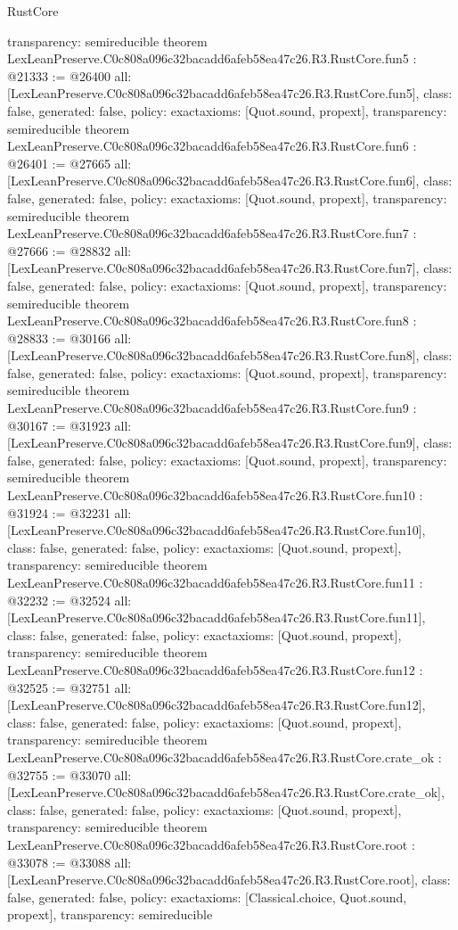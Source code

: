 \begin{lexlean}{RustCore}
\begin{coremodule}
{  transparency: semireducible
}
theorem LexLeanPreserve.C0c808a096c32bacadd6afeb58ea47c26.R3.RustCore.fun5 : @21333 := @26400 {
  all: [LexLeanPreserve.C0c808a096c32bacadd6afeb58ea47c26.R3.RustCore.fun5],
  class: false,
  generated: false,
  policy: exact{axioms: [Quot.sound, propext]},
  transparency: semireducible
}
theorem LexLeanPreserve.C0c808a096c32bacadd6afeb58ea47c26.R3.RustCore.fun6 : @26401 := @27665 {
  all: [LexLeanPreserve.C0c808a096c32bacadd6afeb58ea47c26.R3.RustCore.fun6],
  class: false,
  generated: false,
  policy: exact{axioms: [Quot.sound, propext]},
  transparency: semireducible
}
theorem LexLeanPreserve.C0c808a096c32bacadd6afeb58ea47c26.R3.RustCore.fun7 : @27666 := @28832 {
  all: [LexLeanPreserve.C0c808a096c32bacadd6afeb58ea47c26.R3.RustCore.fun7],
  class: false,
  generated: false,
  policy: exact{axioms: [Quot.sound, propext]},
  transparency: semireducible
}
theorem LexLeanPreserve.C0c808a096c32bacadd6afeb58ea47c26.R3.RustCore.fun8 : @28833 := @30166 {
  all: [LexLeanPreserve.C0c808a096c32bacadd6afeb58ea47c26.R3.RustCore.fun8],
  class: false,
  generated: false,
  policy: exact{axioms: [Quot.sound, propext]},
  transparency: semireducible
}
theorem LexLeanPreserve.C0c808a096c32bacadd6afeb58ea47c26.R3.RustCore.fun9 : @30167 := @31923 {
  all: [LexLeanPreserve.C0c808a096c32bacadd6afeb58ea47c26.R3.RustCore.fun9],
  class: false,
  generated: false,
  policy: exact{axioms: [Quot.sound, propext]},
  transparency: semireducible
}
theorem LexLeanPreserve.C0c808a096c32bacadd6afeb58ea47c26.R3.RustCore.fun10 : @31924 := @32231 {
  all: [LexLeanPreserve.C0c808a096c32bacadd6afeb58ea47c26.R3.RustCore.fun10],
  class: false,
  generated: false,
  policy: exact{axioms: [Quot.sound, propext]},
  transparency: semireducible
}
theorem LexLeanPreserve.C0c808a096c32bacadd6afeb58ea47c26.R3.RustCore.fun11 : @32232 := @32524 {
  all: [LexLeanPreserve.C0c808a096c32bacadd6afeb58ea47c26.R3.RustCore.fun11],
  class: false,
  generated: false,
  policy: exact{axioms: [Quot.sound, propext]},
  transparency: semireducible
}
theorem LexLeanPreserve.C0c808a096c32bacadd6afeb58ea47c26.R3.RustCore.fun12 : @32525 := @32751 {
  all: [LexLeanPreserve.C0c808a096c32bacadd6afeb58ea47c26.R3.RustCore.fun12],
  class: false,
  generated: false,
  policy: exact{axioms: [Quot.sound, propext]},
  transparency: semireducible
}
theorem LexLeanPreserve.C0c808a096c32bacadd6afeb58ea47c26.R3.RustCore.crate_ok : @32755 := @33070 {
  all: [LexLeanPreserve.C0c808a096c32bacadd6afeb58ea47c26.R3.RustCore.crate_ok],
  class: false,
  generated: false,
  policy: exact{axioms: [Quot.sound, propext]},
  transparency: semireducible
}
theorem LexLeanPreserve.C0c808a096c32bacadd6afeb58ea47c26.R3.RustCore.root : @33078 := @33088 {
  all: [LexLeanPreserve.C0c808a096c32bacadd6afeb58ea47c26.R3.RustCore.root],
  class: false,
  generated: false,
  policy: exact{axioms: [Classical.choice, Quot.sound, propext]},
  transparency: semireducible
}


\end{coremodule}
\end{lexlean}
